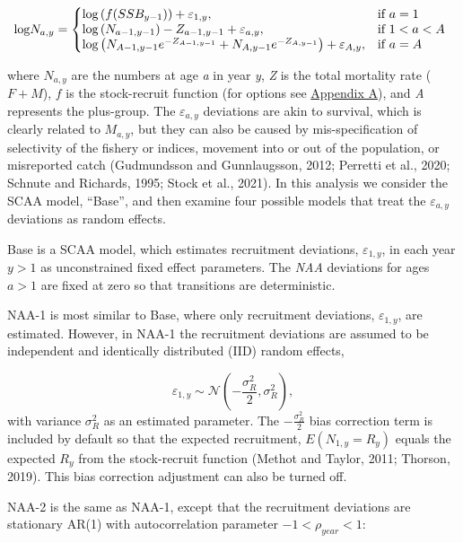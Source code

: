\documentclass[]{article}
\begin{document}
\begin{equation}
\label{eq:NAA}
  \text{log}N_{a,y}=\left\{
    \begin{array}{@{}lll@{}}
      \text{log} \left( f(SSB_{y-1}) \right) + \varepsilon_{1,y}, & \text{if}\ a = 1 \\
      \text{log} \left( N_{a-1,y-1} \right) - Z_{a-1,y-1} + \varepsilon_{a,y}, & \text{if}\ 1 < a < A \\
      \text{log} \left( N_{A-1,y-1} e^{-Z_{A-1,y-1}} + N_{A,y-1} e^{-Z_{A,y-1}} \right) + \varepsilon_{A,y}, & \text{if}\ a = A
    \end{array}\right.
\end{equation}

where \(N_{a,y}\) are the numbers at age \emph{a} in year \emph{y},
\emph{Z} is the total mortality rate (\(F + M\)), \(f\) is the
stock-recruit function (for options see
\protect\hyperlink{appendix-a}{Appendix A}), and \emph{A} represents the
plus-group. The \(\varepsilon_{a,y}\) deviations are akin to survival,
which is clearly related to \(M_{a,y}\), but they can also be caused by
mis-specification of selectivity of the fishery or indices, movement
into or out of the population, or misreported catch (Gudmundsson and
Gunnlaugsson, 2012; Perretti et al., 2020; Schnute and Richards, 1995;
Stock et al., 2021). In this analysis we consider the SCAA model,
``Base'', and then examine four possible models that treat the
\(\varepsilon_{a,y}\) deviations as random effects.

Base is a SCAA model, which estimates recruitment deviations,
\(\varepsilon_{1,y}\), in each year \(y > 1\) as unconstrained fixed
effect parameters. The \emph{NAA} deviations for ages \(a > 1\) are
fixed at zero so that transitions are deterministic.

NAA-1 is most similar to Base, where only recruitment deviations,
\(\varepsilon_{1,y}\), are estimated. However, in NAA-1 the recruitment
deviations are assumed to be independent and identically distributed
(IID) random effects,

\[\varepsilon_{1,y} \sim \mathcal{N}\left( - \frac{\sigma^2_R}{2}, \sigma^2_R \right),\]
with variance \(\sigma^2_R\) as an estimated parameter. The
\(- \frac{\sigma^2_R}{2}\) bias correction term is included by default
so that the expected recruitment, \(E(N_{1,y} = R_y)\) equals the
expected \(R_y\) from the stock-recruit function (Methot and Taylor,
2011; Thorson, 2019). This bias correction adjustment can also be turned
off.

NAA-2 is the same as NAA-1, except that the recruitment deviations are
stationary AR(1) with autocorrelation parameter \(-1<\rho_{year}<1\):
\end{document}
